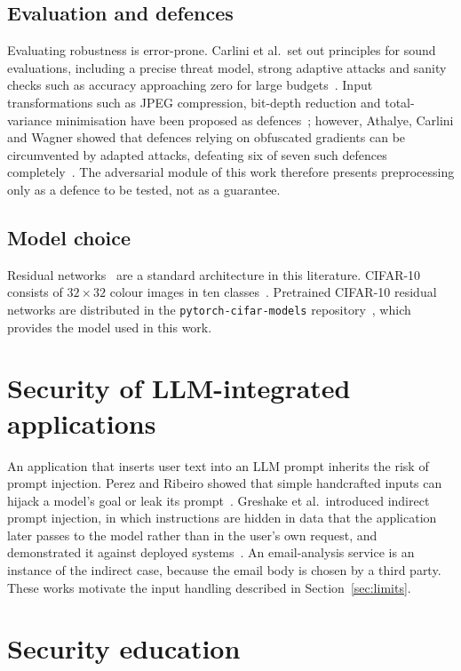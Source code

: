 \subsection{Evaluation and defences}
Evaluating robustness is error-prone. Carlini et al.\ set out principles for sound evaluations, including a precise threat model, strong adaptive attacks and sanity checks such as accuracy approaching zero for large budgets~\cite{carlini2019evaluating}. Input transformations such as JPEG compression, bit-depth reduction and total-variance minimisation have been proposed as defences~\cite{guo2018countering}; however, Athalye, Carlini and Wagner showed that defences relying on obfuscated gradients can be circumvented by adapted attacks, defeating six of seven such defences completely~\cite{athalye2018obfuscated}. The adversarial module of this work therefore presents preprocessing only as a defence to be tested, not as a guarantee.

\subsection{Model choice}
Residual networks~\cite{he2016resnet} are a standard architecture in this literature. CIFAR-10 consists of $32 \times 32$ colour images in ten classes~\cite{krizhevsky2009cifar}. Pretrained CIFAR-10 residual networks are distributed in the \texttt{pytorch-cifar-models} repository~\cite{chenyaofo2021cifar}, which provides the model used in this work.

\section{Security of LLM-integrated applications}
\label{sec:sota-llmsec}

An application that inserts user text into an LLM prompt inherits the risk of prompt injection. Perez and Ribeiro showed that simple handcrafted inputs can hijack a model's goal or leak its prompt~\cite{perez2022ignore}. Greshake et al.\ introduced indirect prompt injection, in which instructions are hidden in data that the application later passes to the model rather than in the user's own request, and demonstrated it against deployed systems~\cite{greshake2023signed}. An email-analysis service is an instance of the indirect case, because the email body is chosen by a third party. These works motivate the input handling described in Section~\ref{sec:limits}.

\section{Security education}
\label{sec:sota-edu}

